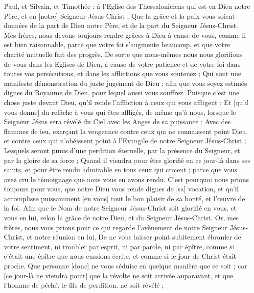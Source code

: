 \BFont
\begin{multicols}{2}
\VerseOne{}Paul, et Silvain, et Timothée : à l'Eglise des Thessaloniciens qui est en Dieu notre Père, et en [notre] Seigneur Jésus-Christ ;
Que la grâce et la paix vous soient données de la part de Dieu notre Père, et de la part du Seigneur Jésus-Christ.
Mes frères, nous devons toujours rendre grâces à Dieu à cause de vous, comme il est bien raisonnable, parce que votre foi s'augmente beaucoup, et que votre charité mutuelle fait des progrès.
De sorte que nous-mêmes nous nous glorifions de vous dans les Eglises de Dieu, à cause de votre patience et de votre foi dans toutes vos persécutions, et dans les afflictions que vous soutenez ;
Qui sont une manifeste démonstration du juste jugement de Dieu ; afin que vous soyez estimés dignes du Royaume de Dieu, pour lequel aussi vous souffrez.
Puisque c'est une chose juste devant Dieu, qu'il rende l'affliction à ceux qui vous affligent ;
Et [qu'il vous donne] du relâche à vous qui êtes affligés, de même qu'à nous, lorsque le Seigneur Jésus sera révélé du Ciel avec les Anges de sa puissance ;
Avec des flammes de feu, exerçant la vengeance contre ceux qui ne connaissent point Dieu, et contre ceux qui n'obéissent point à l'Evangile de notre Seigneur Jésus-Christ ;
Lesquels seront punis d'une perdition éternelle, par la présence du Seigneur, et par la gloire de sa force ;
Quand il viendra pour être glorifié en ce jour-là dans ses saints, et pour être rendu admirable en tous ceux qui croient ; parce que vous avez cru le témoignage que nous vous en avons rendu.
C'est pourquoi nous prions toujours pour vous, que notre Dieu vous rende dignes de [sa] vocation, et qu'il accomplisse puissamment [en vous] tout le bon plaisir de sa bonté, et l'œuvre de la foi.
Afin que le Nom de notre Seigneur Jésus-Christ soit glorifié en vous, et vous en lui, selon la grâce de notre Dieu, et du Seigneur Jésus-Christ.
\VerseOne{}Or, mes frères, nous vous prions pour ce qui regarde l'avènement de notre Seigneur Jésus-Christ, et notre réunion en lui,
De ne vous laisser point subitement ébranler de votre sentiment, ni troubler par esprit, ni par parole, ni par épître, comme si c'était une épître que nous eussions écrite, et comme si le jour de Christ était proche.
Que personne [donc] ne vous séduise en quelque manière que ce soit ; car [ce jour-là ne viendra point] que la révolte ne soit arrivée auparavant, et que l'homme de péché, le fils de perdition, ne soit révélé ;

\end{multicols}
